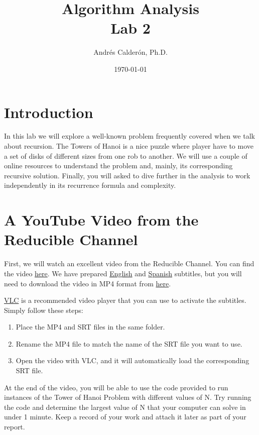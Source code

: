 \documentclass[11pt]{article}
\title{Algorithm Analysis \\ Lab 2}
\author{Andrés Calderón, Ph.D.}
\date{\today}
\begin{document}
\maketitle

\section{Introduction}
In this lab we will explore a well-known problem frequently covered when we talk about recursion.  The Towers of Hanoi is a nice puzzle where player have to move a set of disks of different sizes from one rob to another.  We will use a couple of online resources to understand the problem and, mainly, its corresponding recursive solution.  Finally, you will asked to dive further in the analysis to work independently in its recurrence formula and complexity.

\section{A YouTube Video from the Reducible Channel}\label{sec:reducible}
First, we will watch an excellent video from the Reducible Channel. You can find the video \href{https://www.youtube.com/watch?v=rf6uf3jNjbo}{here}.
We have prepared \href{https://drive.google.com/file/d/1hDacb41pGUKO_J6gFWMA8fPpuPSJdE5h/view?usp=drive_link}{English} and \href{https://drive.google.com/file/d/15krFvJwWnhg4-QKkIE5xJiqRnBZTi9GP/view?usp=drive_link}{Spanish} subtitles, but you will need to download the video in MP4 format from \href{https://drive.google.com/file/d/1md8574OHPTrH5oscsDb8kNA5BIRyFa4O/view?usp=sharing}{here}.

\href{https://www.videolan.org/vlc/}{VLC} is a recommended video player that you can use to activate the subtitles. Simply follow these steps:

\begin{enumerate}
    \item Place the MP4 and SRT files in the same folder.
    \item Rename the MP4 file to match the name of the SRT file you want to use.
    \item Open the video with VLC, and it will automatically load the corresponding SRT file.
\end{enumerate}

At the end of the video, you will be able to use the code provided to run instances of the Tower of Hanoi Problem with different values of N. Try running the code and determine the largest value of N that your computer can solve in under 1 minute.  Keep a record of your work and attach it later as part of your report.
\end{document}
